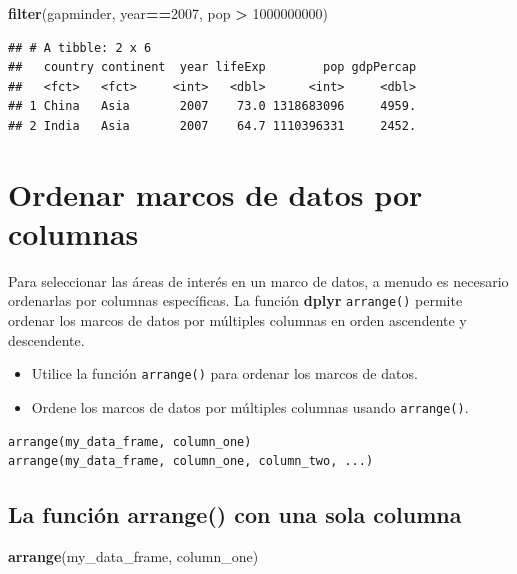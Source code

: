 \documentclass[
]{book}
\newenvironment{Shaded}{\begin{snugshade}}{\end{snugshade}}
\newcommand{\DecValTok}[1]{\textcolor[rgb]{0.00,0.00,0.81}{#1}}
\newcommand{\KeywordTok}[1]{\textcolor[rgb]{0.13,0.29,0.53}{\textbf{#1}}}
\newcommand{\NormalTok}[1]{#1}
\newcommand{\OperatorTok}[1]{\textcolor[rgb]{0.81,0.36,0.00}{\textbf{#1}}}
\newcommand{\StringTok}[1]{\textcolor[rgb]{0.31,0.60,0.02}{#1}}
\providecommand{\tightlist}{%
  \setlength{\itemsep}{0pt}\setlength{\parskip}{0pt}}
\begin{document}
\begin{Shaded}
\begin{Highlighting}[]
\KeywordTok{filter}\NormalTok{(gapminder, year}\OperatorTok{==}\DecValTok{2007}\NormalTok{, pop }\OperatorTok{>}\StringTok{ }\DecValTok{1000000000}\NormalTok{)}
\end{Highlighting}
\end{Shaded}

\begin{verbatim}
## # A tibble: 2 x 6
##   country continent  year lifeExp        pop gdpPercap
##   <fct>   <fct>     <int>   <dbl>      <int>     <dbl>
## 1 China   Asia       2007    73.0 1318683096     4959.
## 2 India   Asia       2007    64.7 1110396331     2452.
\end{verbatim}

\hypertarget{ordenar-marcos-de-datos-por-columnas}{%
\section{Ordenar marcos de datos por columnas}\label{ordenar-marcos-de-datos-por-columnas}}

Para seleccionar las áreas de interés en un marco de datos, a menudo es necesario ordenarlas por columnas específicas. La función \textbf{dplyr} \texttt{arrange()} permite ordenar los marcos de datos por múltiples columnas en orden ascendente y descendente.

\begin{itemize}
\tightlist
\item
  Utilice la función \texttt{arrange()} para ordenar los marcos de datos.
\item
  Ordene los marcos de datos por múltiples columnas usando \texttt{arrange()}.
\end{itemize}

\begin{verbatim}
arrange(my_data_frame, column_one)
arrange(my_data_frame, column_one, column_two, ...)
\end{verbatim}

\hypertarget{la-funciuxf3n-arrange-con-una-sola-columna}{%
\subsection{La función arrange() con una sola columna}\label{la-funciuxf3n-arrange-con-una-sola-columna}}

\begin{Shaded}
\begin{Highlighting}[]
\KeywordTok{arrange}\NormalTok{(my_data_frame, column_one)}
\end{Highlighting}
\end{Shaded}
\end{document}

